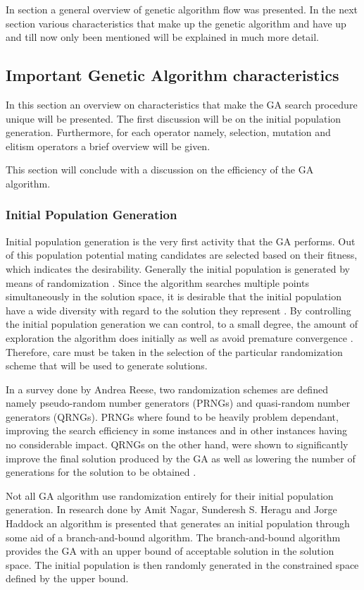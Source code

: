 In section a general overview of genetic algorithm flow was presented. In the next section various characteristics that make up the genetic algorithm and have up and till now only been mentioned will be explained in much more detail.
\subsection{Important Genetic Algorithm characteristics}
In this section an overview on characteristics that make the GA search procedure unique will be presented. The first discussion will be on the initial population generation. Furthermore, for each operator namely, selection, mutation and elitism operators a brief overview will be given.

This section will conclude with a discussion on the efficiency of the GA algorithm.
\subsubsection{Initial Population Generation}
Initial population generation is the very first activity that the GA performs. Out of this population potential mating candidates are selected based on their fitness, which indicates the desirability. Generally the initial population is generated by means of randomization \cite{SelfAdaptiveGA}. Since the algorithm searches multiple points simultaneously in the solution space, it is desirable that the initial population have a wide diversity with regard to the solution they represent \cite{CombinedBranchBoundGA,DistributedHierarchicalGA}. By controlling the initial population generation we can control, to a small degree, the amount of exploration the algorithm does initially as well as avoid premature convergence \cite{CombinedBranchBoundGA}. Therefore, care must be taken in the selection of the particular randomization scheme that will be used to generate solutions.

In a survey done by Andrea Reese\cite{RandomNumberGA}, two randomization schemes are defined namely pseudo-random number generators (PRNGs) and quasi-random number generators (QRNGs). PRNGs where found to be heavily problem dependant, improving the search efficiency in some instances and in other instances having no considerable impact. QRNGs on the other hand, were shown to significantly improve the final solution produced by the GA as well as lowering the number of generations for the solution to be obtained \cite{RandomNumberGA}.

Not all GA algorithm use randomization entirely for their initial population generation. In research done by Amit Nagar, Sunderesh S. Heragu and Jorge Haddock\cite{CombinedBranchBoundGA} an algorithm is presented that generates an initial population through some aid of a branch-and-bound algorithm. The branch-and-bound algorithm provides the GA with an upper bound of acceptable solution in the solution space. The initial population is then randomly generated in the constrained space defined by the upper bound\cite{CombinedBranchBoundGA}.
